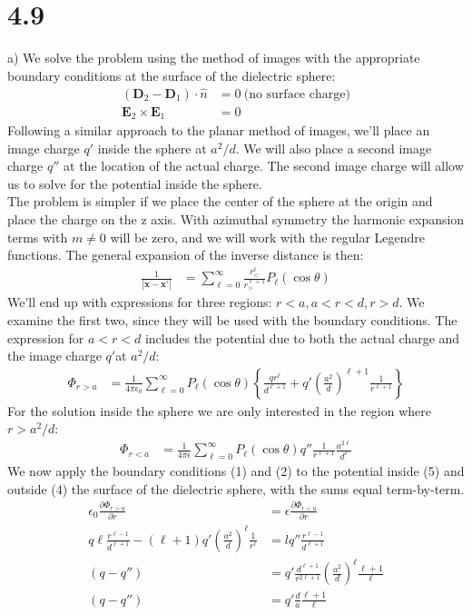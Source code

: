 \documentclass[a4paper,11pt]{article}
\numberwithin{equation}{section}
\newcommand{\bvp}[1]{\mathbf{#1}'}
\newcommand{\bv}[1]{\mathbf{#1}}
\newcommand{\ez}{\epsilon_0}
\newcommand{\lrp}[1]{\left({#1}\right)}
\newcommand{\lrb}[1]{\left\{{#1}\right\}}
\begin{document}
\section{4.9}
a) We solve the problem using the method of images with the appropriate boundary conditions at the surface of the dielectric sphere:
\begin{align}
 (\bv{D}_2-\bv{D}_1)\cdot \hat{n} &= 0\ \text{(no surface charge)}\\
 \bv{E}_2 \times \bv{E}_1 &= 0
\end{align}
Following a similar approach to the planar method of images, we'll place an image charge $q'$ inside the sphere at $a^2/d$.
We will also place a second image charge $q''$ at the location of the actual charge.
The second image charge will allow us to solve for the potential inside the sphere.\\
The problem is simpler if we place the center of the sphere at the origin and place the charge on the z axis.
With azimuthal symmetry the harmonic expansion terms with $m\ne 0$ will be zero, and we will work with the regular Legendre functions.
The general expansion of the inverse distance is then:
\begin{align}
 \frac{1}{|\bv{x}-\bvp{x}|} &= \sum_{\ell=0}^\infty \frac{r_<^\ell}{r_>^{\ell+1}}P_\ell (\cos\theta)
\end{align}
We'll end up with expressions for three regions: $r<a,a<r<d,r>d$.
We examine the first two, since they will be used with the boundary conditions.
The expression for $a<r<d$ includes the potential due to both the actual charge and the image charge $q'$at $a^2/d$:
\begin{align}
 \Phi_{r>a} &= \frac{1}{4\pi\ez}\sum_{\ell=0}^\infty P_\ell(\cos\theta)\lrb{ \frac{qr^\ell}{d^{\ell+1}}+q'\lrp{\frac{a^2}{d}}^{\ell+1}\frac{1}{r^{\ell+1}} }
\end{align}
For the solution inside the sphere we are only interested in the region where $r>a^2/d$:
\begin{align}
 \Phi_{r<a} &= \frac{1}{4\pi\epsilon}\sum_{\ell=0}^\infty P_\ell(\cos\theta)q''\frac{1}{r^{\ell+1}}\frac{a^{2\ell}}{d^\ell}
\end{align}
We now apply the boundary conditions (1) and (2) to the potential inside (5) and outside (4) the surface of the dielectric sphere, with the sums equal term-by-term.
\begin{align}
 \ez\frac{\partial \Phi_{r>a}}{\partial r} &= \epsilon \frac{\partial \Phi_{r<a}}{\partial r}\\
 q\ell\frac{r^{\ell-1}}{d^{\ell+1}}-(\ell+1)q'\lrp{\frac{a^2}{d}}^\ell\frac{1}{r^\ell} &= lq'' \frac{r^{\ell-1}}{d^{\ell+1}}\\
 (q-q'') &= q' \frac{d^{\ell+1}}{r^{2\ell+1}}\lrp{\frac{a^2}{d}}^\ell\frac{\ell+1}{\ell}\\
 (q-q'') &= q' \frac{d}{a}\frac{\ell+1}{\ell}
\end{align}
\end{document}
